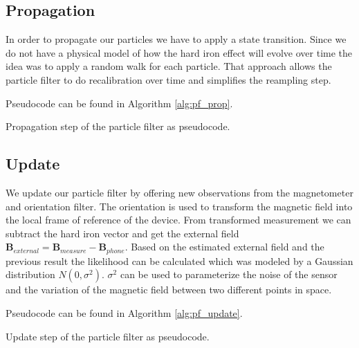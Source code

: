 \subsection{Propagation}

In order to propagate our particles we have to apply a state transition. Since we do not have a physical model of how the hard iron effect will evolve over time the idea was to apply a random walk for each particle. That approach allows the particle filter to do recalibration over time and simplifies the reampling step.

Pseudocode can be found in Algorithm \ref{alg:pf_prop}.

\begin{algorithm}[h]
	\caption{Propagation step of the particle filter as pseudocode.}
	\label{alg:pf_prop}
\end{algorithm}

\subsection{Update}

We update our particle filter by offering new observations from the magnetometer and orientation filter. The orientation is used to transform the magnetic field into the local frame of reference of the device. From transformed measurement we can subtract the hard iron vector and get the external field $\bm{B}_{external} = \bm{B}_{measure} - \bm{B}_{phone}$. Based on the estimated external field and the previous result the likelihood can be calculated which was modeled by a Gaussian distribution $N(0, \sigma^2)$. $\sigma^2$ can be used to parameterize the noise of the sensor and the variation of the magnetic field between two different points in space.

Pseudocode can be found in Algorithm \ref{alg:pf_update}.

\begin{algorithm}[h]
	\caption{Update step of the particle filter as pseudocode.}
	\label{alg:pf_update}
\end{algorithm}


